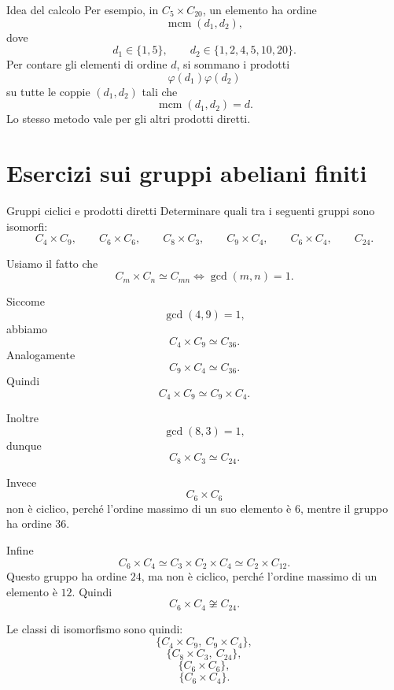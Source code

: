\documentclass[a4paper]{article}
\begin{document}
\begin{radioactive}
\begin{snippetproof}{Idea del calcolo}
    Per esempio, in \(C_5\times C_{20}\), un elemento ha ordine
    \[
        \operatorname{mcm}(d_1,d_2),
    \]
    dove
    \[
        d_1\in\{1,5\},
        \qquad
        d_2\in\{1,2,4,5,10,20\}.
    \]
    Per contare gli elementi di ordine \(d\), si sommano i prodotti
    \[
        \varphi(d_1)\varphi(d_2)
    \]
    su tutte le coppie \((d_1,d_2)\) tali che
    \[
        \operatorname{mcm}(d_1,d_2)=d.
    \]
    Lo stesso metodo vale per gli altri prodotti diretti.
\end{snippetproof}
\end{radioactive}

\section{Esercizi sui gruppi abeliani finiti}

\begin{radioactive}
\begin{snippetexercise}{Gruppi ciclici e prodotti diretti}
    Determinare quali tra i seguenti gruppi sono isomorfi:
    \[
        C_4\times C_9,
        \qquad
        C_6\times C_6,
        \qquad
        C_8\times C_3,
        \qquad
        C_9\times C_4,
        \qquad
        C_6\times C_4,
        \qquad
        C_{24}.
    \]
\end{snippetexercise}
\end{radioactive}

\begin{radioactive}
\begin{snippetsolution}{}
    Usiamo il fatto che
    \[
        C_m\times C_n\simeq C_{mn}
        \iff
        \gcd(m,n)=1.
    \]

    Siccome
    \[
        \gcd(4,9)=1,
    \]
    abbiamo
    \[
        C_4\times C_9\simeq C_{36}.
    \]
    Analogamente
    \[
        C_9\times C_4\simeq C_{36}.
    \]
    Quindi
    \[
        C_4\times C_9\simeq C_9\times C_4.
    \]

    Inoltre
    \[
        \gcd(8,3)=1,
    \]
    dunque
    \[
        C_8\times C_3\simeq C_{24}.
    \]

    Invece
    \[
        C_6\times C_6
    \]
    non è ciclico, perché l'ordine massimo di un suo elemento è \(6\), mentre il gruppo ha ordine \(36\).

    Infine
    \[
        C_6\times C_4
        \simeq
        C_3\times C_2\times C_4
        \simeq
        C_2\times C_{12}.
    \]
    Questo gruppo ha ordine \(24\), ma non è ciclico, perché l'ordine massimo di un elemento è \(12\). Quindi
    \[
        C_6\times C_4\not\cong C_{24}.
    \]

    Le classi di isomorfismo sono quindi:
    \[
        \{C_4\times C_9,\ C_9\times C_4\},
    \]
    \[
        \{C_8\times C_3,\ C_{24}\},
    \]
    \[
        \{C_6\times C_6\},
    \]
    \[
        \{C_6\times C_4\}.
    \]
\end{snippetsolution}
\end{radioactive}
\end{document}
